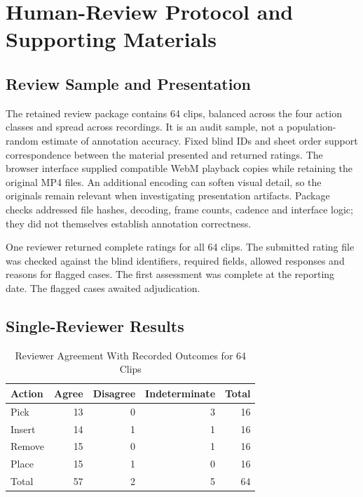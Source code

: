 \chapter{Human-Review Protocol and Supporting Materials}
\label{app:human-review}

\section{Review Sample and Presentation}

The retained review package contains 64 clips, balanced across the four action classes
and spread across recordings. It is an audit sample, not a population-random estimate of
annotation accuracy. Fixed blind IDs and sheet order support correspondence between the
material presented and returned ratings. The browser interface supplied compatible WebM
playback copies while retaining the original MP4 files. An additional encoding can
soften visual detail, so the originals remain relevant when investigating presentation
artifacts. Package checks addressed file hashes, decoding, frame counts, cadence and
interface logic; they did not themselves establish annotation correctness.

One reviewer returned complete ratings for all 64 clips. The submitted rating file was
checked against the blind identifiers, required fields, allowed responses and reasons
for flagged cases. The first assessment was complete at the reporting date. The flagged
cases awaited adjudication.

\section{Single-Reviewer Results}

\begin{table}[htbp]
\caption{Reviewer Agreement With Recorded Outcomes for 64 Clips}\label{tab:human-review-outcomes}
\centering

\begin{tabular}{lrrrr}
\toprule Action & Agree & Disagree & Indeterminate & Total \\
\midrule
Pick &13&0&3&16\\
Insert &14&1&1&16\\
Remove &15&0&1&16\\
Place &15&1&0&16\\
\midrule
Total &57&2&5&64\\
\bottomrule
\end{tabular}
\end{table}

